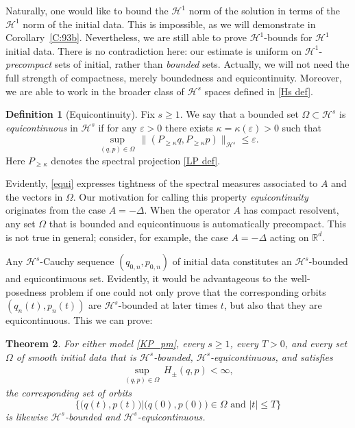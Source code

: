\documentclass{amsart}
\newcommand{\R}{{\mathbb{R}}}
\newcommand{\eps}{\varepsilon}
\newtheorem{theorem}{Theorem}[section]
\theoremstyle{definition}
\newtheorem{definition}[theorem]{Definition}
\numberwithin{equation}{section}
\renewcommand{\H}{\mathcal H}
\begin{document}
Naturally, one would like to bound the $\H^1$ norm of the solution in terms of the $\H^1$ norm of the initial data.  This is impossible, as we will demonstrate in Corollary~\ref{C:93b}.  Nevertheless, we are still able to prove $\H^1$-bounds for $\H^1$ initial data.  There is no contradiction here: our estimate is uniform on $\H^1$-\emph{precompact} sets of initial, rather than \emph{bounded} sets.  Actually, we will not need the full strength of compactness, merely boundedness and equicontinuity. Moreover, we are able to work in the broader class of $\H^s$ spaces defined in \eqref{Hs def}.


\begin{definition}[Equicontinuity]\label{D:equi}
Fix $s\geq 1$. We say that a bounded set $\Omega \subset \H^s$ is \emph{equicontinuous} in $\H^s$ if for any $\eps>0$ there exists $\kappa=\kappa(\eps)>0$ such that
\begin{equation}\label{equi}
\sup_{(q,p)\in\Omega}\, \|(P_{\geq \kappa}q, P_{\geq \kappa} p)\|_{ \H^s} \leq \eps.
\end{equation}
Here $P_{\geq \kappa}$ denotes the spectral projection \eqref{LP def}. 
\end{definition}

Evidently, \eqref{equi} expresses tightness of the spectral measures associated to $A$ and the vectors in $\Omega$. Our motivation for calling this property \emph{equicontinuity} originates from the case $A=-\Delta$.  When the operator $A$ has compact resolvent, any set $\Omega$ that is bounded and equicontinuous is automatically precompact.  This is not true in general; consider, for example, the case $A=-\Delta$ acting on $\R^d$.

Any $\H^s$-Cauchy sequence $(q_{0,n},p_{0,n})$ of initial data constitutes an $\H^s$-bounded and equicontinuous set.  Evidently, it would be advantageous to the well-posedness problem if one could not only prove that the corresponding orbits $(q_n(t),p_n(t))$ are $\H^s$-bounded at later times $t$, but also that they are equicontinuous.  This we can prove:


\begin{theorem}\label{T:1.2}
For either model \eqref{KP_pm}, every  $s\geq 1$, every $T>0$, and every set $\Omega$ of smooth initial data that is $\H^s$-bounded, $\H^s$-equicontinuous,
and satisfies
\begin{align}\label{energy_pm}
\sup_{(q,p) \in \Omega}\, H_\pm(q,p)<\infty,
\end{align}
the corresponding set of orbits
\begin{equation}\label{T:1.2a}
 \bigl\{ \bigl(q(t),p(t)\bigr) \big| \bigl(q(0),p(0)\bigr)\in\Omega \text{ and } |t|\leq T \bigr\}
\end{equation}
is likewise $\H^s$-bounded and $\H^s$-equicontinuous.
\end{theorem}
\end{document}
